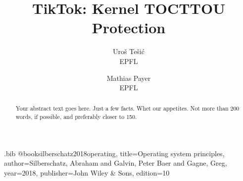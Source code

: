 \usepackage{filecontents}

\usepackage{listings}
\usepackage{parcolumns}
\usepackage{graphicx}
\usepackage{caption}
\usepackage{subcaption}

\begin{filecontents}{\jobname.bib}
@book{silberschatz2018operating,
  title={Operating system principles},
  author={Silberschatz, Abraham and Galvin, Peter Baer and Gagne, Greg},
  year={2018},
  publisher={John Wiley \& Sons},
  edition={10}
}

\end{filecontents}



\date{}

\title{\Large \bf TikTok: Kernel TOCTTOU Protection}

\author{
{\rm Uro\v{s} Te\v{s}i\'{c}}\\
EPFL
\and
{\rm Mathias Payer}\\
EPFL
} %

\maketitle

\begin{abstract}
Your abstract text goes here. Just a few facts. Whet our appetites.
Not more than 200 words, if possible, and preferably closer to 150.
\end{abstract}

